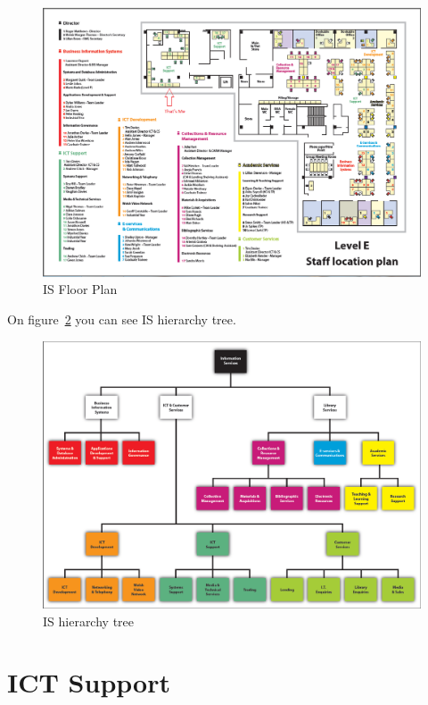 \documentclass[10pt,a4paper,headinclude=true]{report}
\begin{document}
\begin{figure}[H]
\centering
\centerline{\includegraphics[scale=0.55]{./isfloorplan}}
\caption{IS Floor Plan \cite{ISFloor}}
\label{fig:isfloorplan}
\end{figure}

On figure~\ref{fig:i-s-hierarchy-tree-march-2012} you can see IS hierarchy tree.

\begin{figure}[H]
\centering
\centerline{\includegraphics[scale=0.55]{./i-s-hierarchy-tree-march-2012}}
\caption{IS hierarchy tree}
\label{fig:i-s-hierarchy-tree-march-2012}
\end{figure}

\section{ICT Support}
\end{document}

